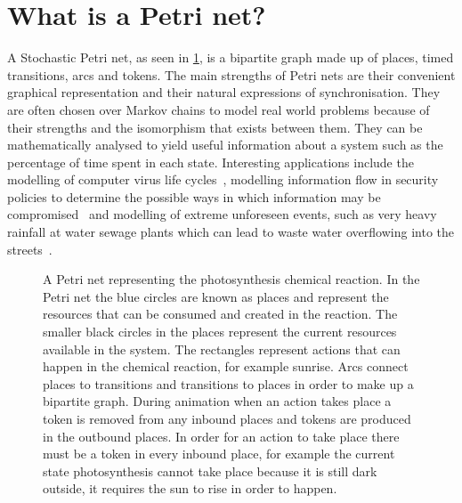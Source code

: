 \section{What is a Petri net?}
A Stochastic Petri net,  as seen in \cref{tikz:photo}, is a bipartite graph made up of places, timed transitions, arcs and tokens. The main strengths of Petri nets are their convenient graphical representation and their natural expressions of synchronisation. They are often chosen over Markov chains to model real world problems because of their strengths and the isomorphism that exists between them. They can be mathematically analysed to yield useful information about a system such as the percentage of time spent in each state. Interesting applications include the modelling of computer virus life cycles~\cite{kotenko2005analyzing}, modelling information flow in security policies to determine the possible ways in which information may be compromised~\cite{varadharajan1990petri} and modelling of extreme unforeseen events, such as very heavy rainfall at water sewage plants which can lead to waste water overflowing into the streets~\cite{ghasemieh2013analysis}.

\begin{figure}[tb]

\caption{A Petri net representing the photosynthesis chemical reaction. In the Petri net the blue circles are known as places and represent the resources that can be consumed and created in the reaction. The smaller black circles in the places represent the current resources available in the system. The rectangles represent actions that can happen in the chemical reaction, for example sunrise. Arcs connect places to transitions and transitions to places in order to make up a bipartite graph. During animation when an action takes place a token is removed from any inbound places and tokens are produced in the outbound places. In order for an action to take place there must be a token in every inbound place, for example the current state photosynthesis cannot take place because it is still dark outside, it requires the sun to rise in order to happen. }
\label{tikz:photo}
\end{figure}